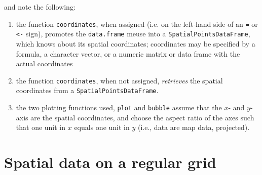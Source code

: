 \documentclass[a4paper]{article}
\newcommand{\code}[1]{{\tt #1}}
\begin{document}
and note the following: 
\begin{enumerate}
\item the function \code{coordinates}, when assigned (i.e. on
the left-hand side of an \verb|=| or \verb|<-| sign), promotes the
\code{data.frame} meuse into a \code{SpatialPointsDataFrame}, which knows about
its spatial coordinates; coordinates may be specified by a formula,
a character vector, or a numeric matrix or data frame with the actual
coordinates
\item the function \code{coordinates}, when not assigned, {\em retrieves}
the spatial coordinates from a \code{SpatialPointsDataFrame}.
\item the two plotting functions used, \code{plot} and \code{bubble}
assume that the $x$- and $y$-axis are the spatial coordinates, and
choose the aspect ratio of the axes such that one unit in $x$
equals one unit in $y$ (i.e., data are map data, projected).
\end{enumerate}

\section{Spatial data on a regular grid}
\end{document}
